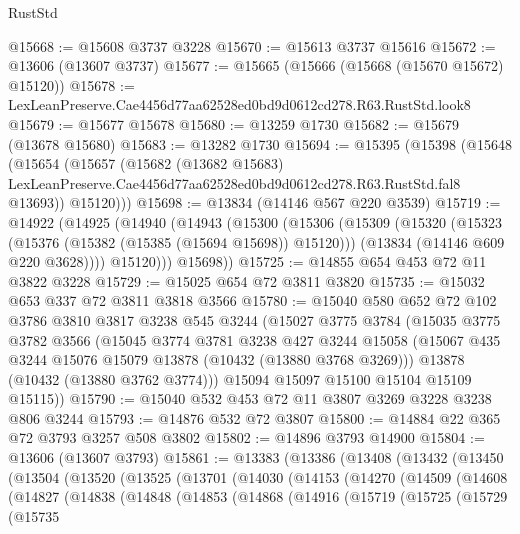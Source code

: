 \begin{lexlean}{RustStd}
\begin{coremodule}
@15668 := @15608 @3737 @3228
@15670 := @15613 @3737 @15616
@15672 := @13606 (@13607 @3737)
@15677 := @15665 (@15666 (@15668 (@15670 @15672) @15120))
@15678 := LexLeanPreserve.Cae4456d77aa62528ed0bd9d0612cd278.R63.RustStd.look8
@15679 := @15677 @15678
@15680 := @13259 @1730
@15682 := @15679 (@13678 @15680)
@15683 := @13282 @1730
@15694 := @15395
    (@15398
      (@15648
        (@15654
          (@15657
            (@15682
              (@13682 @15683)
              LexLeanPreserve.Cae4456d77aa62528ed0bd9d0612cd278.R63.RustStd.fal8
              @13693))
          @15120)))
@15698 := @13834 (@14146 @567 @220 @3539)
@15719 := @14922
    (@14925
      (@14940
        (@14943
          (@15300
            (@15306
              (@15309
                (@15320
                  (@15323 (@15376 (@15382 (@15385 (@15694 @15698)) @15120)))
                  (@13834 (@14146 @609 @220 @3628))))
              @15120)))
        @15698))
@15725 := @14855 @654 @453 @72 @11 @3822 @3228
@15729 := @15025 @654 @72 @3811 @3820
@15735 := @15032 @653 @337 @72 @3811 @3818 @3566
@15780 := @15040
    @580
    @652
    @72
    @102
    @3786
    @3810
    @3817
    @3238
    @545
    @3244
    (@15027
      @3775
      @3784
      (@15035
        @3775
        @3782
        @3566
        (@15045
          @3774
          @3781
          @3238
          @427
          @3244
          @15058
          (@15067 @435 @3244 @15076 @15079 @13878 (@10432 (@13880 @3768 @3269)))
          @13878
          (@10432 (@13880 @3762 @3774)))
        @15094
        @15097
        @15100
        @15104
        @15109
        @15115))
@15790 := @15040 @532 @453 @72 @11 @3807 @3269 @3228 @3238 @806 @3244
@15793 := @14876 @532 @72 @3807
@15800 := @14884 @22 @365 @72 @3793 @3257 @508 @3802
@15802 := @14896 @3793 @14900
@15804 := @13606 (@13607 @3793)
@15861 := @13383
    (@13386
      (@13408
        (@13432
          (@13450
            (@13504
              (@13520
                (@13525
                  (@13701
                    (@14030
                      (@14153
                        (@14270
                          (@14509
                            (@14608
                              (@14827
                                (@14838
                                  (@14848
                                    (@14853
                                      (@14868
                                        (@14916
                                          (@15719
                                            (@15725
                                              (@15729
                                                (@15735

\end{coremodule}
\end{lexlean}
